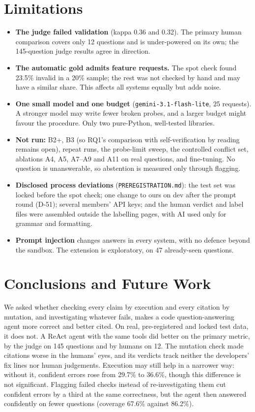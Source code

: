 \documentclass[10pt,a4paper]{article}
\newcommand{\code}[1]{\texttt{\small #1}}
\begin{document}
\section{Limitations}

\begin{itemize}
\item \textbf{The judge failed validation} (kappa 0.36 and 0.32). The primary human comparison covers only 12
questions and is under-powered on its own; the 145-question judge results agree in direction.
\item \textbf{The automatic gold admits feature requests.} The spot check found 23.5\% invalid in a 20\% sample; the
rest was not checked by hand and may have a similar share. This affects all systems equally but adds noise.
\item \textbf{One small model and one budget} (\code{gemini-3.1-flash-lite}, 25 requests). A stronger model may write
fewer broken probes, and a larger budget might favour the procedure. Only two pure-Python, well-tested libraries.
\item \textbf{Not run:} B2+, B3 (so RQ1's comparison with self-verification by reading remains open), repeat runs, the
probe-limit sweep, the controlled conflict set, ablations A4, A5, A7--A9 and A11 on real questions, and fine-tuning.
No question is unanswerable, so abstention is measured only through flagging.
\item \textbf{Disclosed process deviations} (\code{PREREGISTRATION.md}): the test set was locked before the spot
check; one change to ours on dev after the prompt round (D-51); several members' API keys; and the human verdict and
label files were assembled outside the labelling pages, with AI used only for grammar and formatting.
\item \textbf{Prompt injection} changes answers in every system, with no defence beyond the sandbox. The extension is
exploratory, on 47 already-seen questions.
\end{itemize}

\section{Conclusions and Future Work}

We asked whether checking every claim by execution and every citation by mutation, and investigating whatever fails,
makes a code question-answering agent more correct and better cited. On real, pre-registered and locked test data, it
does not. A ReAct agent with the same tools did better on the primary metric, by the judge on 145 questions and by
humans on 12. The mutation check made citations worse in the humans' eyes, and its verdicts track neither the
developers' fix lines nor human judgements. Execution may still help in a narrower way: without it, confident errors
rose from 29.7\% to 36.6\%, though this difference is not significant. Flagging failed checks instead of
re-investigating them cut confident errors by a third at the same correctness, but the agent then answered
confidently on fewer questions (coverage 67.6\% against 86.2\%).
\end{document}
